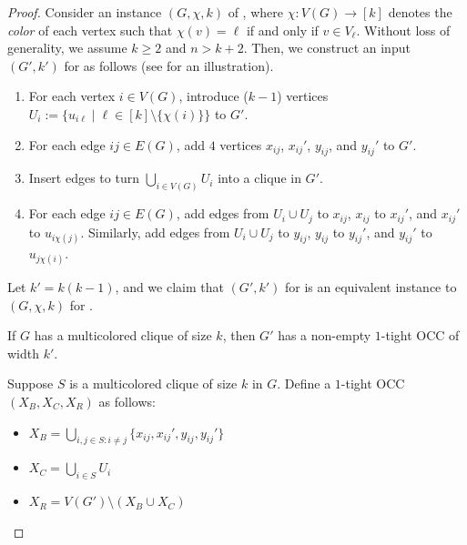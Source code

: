 \begin{proof}
  Consider an instance $(G,\chi,k)$ of ,
  where $\chi\colon V(G) \to [k]$ denotes the \textit{color} of each vertex such that
  $\chi(v)=\ell$ if and only if $v \in V_\ell$.
%
  Without loss of generality, we assume $k \geq 2$ and $n > k + 2$.
%
  Then, we construct an input $(G',k')$ for  as follows
  (see  for an illustration).
%
  \begin{enumerate}
    \item For each vertex $i \in V(G)$, introduce ($k-1$) vertices $U_{i}:=\{u_{i\ell} \mid \ell \in [k] \setminus \{\chi(i)\}\}$ to $G'$.
    \item For each edge $ij \in E(G)$, add $4$ vertices $x_{ij}$, $x_{ij}'$, $y_{ij}$, and $y_{ij}'$ to $G'$.
    \item Insert edges to turn $\bigcup_{i \in V(G)}U_i$ into a clique in $G'$.
    \item For each edge $ij \in E(G)$, add edges from $U_i \cup U_j$ to $x_{ij}$,
    $x_{ij}$ to $x_{ij}'$, and $x_{ij}'$ to $u_{i \chi(j)}$.
    Similarly, add edges from $U_i \cup U_j$ to $y_{ij}$,
    $y_{ij}$ to $y_{ij}'$, and $y_{ij}'$ to $u_{j \chi(i)}$.
  \end{enumerate}

  Let $k'=k(k-1)$, and we claim that $(G',k')$ for 
    is an equivalent instance to $(G,\chi,k)$ for .

  \begin{claim}\label{clm:w1-hardness-forward}
    If $G$ has a multicolored clique of size $k$, then $G'$ has a non-empty $1$-tight OCC of width $k'$.
  \end{claim}

  \begin{claimproof}
    Suppose $S$ is a multicolored clique of size $k$ in $G$.
    Define a $1$-tight OCC $(X_B,X_C,X_R)$ as follows:
    \begin{itemize}
      \item $X_B = \bigcup_{i,j \in S:i \neq j} \{ x_{ij}, x_{ij}', y_{ij}, y_{ij}' \}$
      \item $X_C = \bigcup_{i \in S} U_i$
      \item $X_R = V(G') \setminus (X_B \cup X_C)$
    \end{itemize}


\end{claimproof}
\end{proof}
